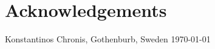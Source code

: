 \newpage
\clearpage
\mbox{}
\newpage
\clearpage
\thispagestyle{empty}
\section*{Acknowledgements}

\hfill Konstantinos Chronis, Gothenburb, Sweden \today
\newpage
\clearpage
\mbox{}
